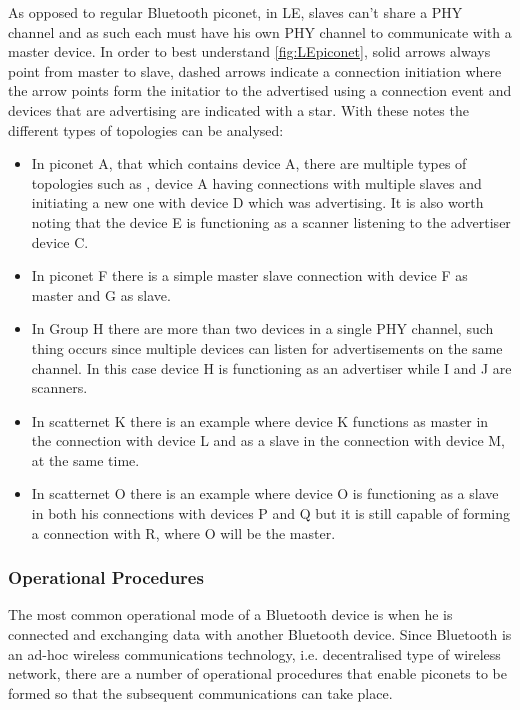 As opposed to regular Bluetooth piconet, in \ac{LE}, slaves can't share a \ac{PHY} channel and as such each must have his own \ac{PHY} channel to communicate with a master device. In order to best understand \ref{fig:LEpiconet}, solid arrows always point from master to slave, dashed arrows indicate a connection initiation where the arrow points form the initatior to the advertised using a connection event and devices that are advertising are indicated with a star. With these notes the different types of topologies can be analysed:

\begin{itemize}
\item In piconet A, that which contains device A, there are multiple types of topologies such as , device A having connections with multiple slaves and initiating a new one with device D which was advertising. It is also worth noting that the device E is functioning as a scanner listening to the advertiser device C.

\item In piconet F there is a simple master slave connection with device F as master and G as slave.

\item In Group H there are more than two devices in a single \ac{PHY} channel, such thing occurs since multiple devices can listen for advertisements on the same channel. In this case device H is functioning as an advertiser while I and J are scanners.

\item In scatternet K there is an example where device K functions as master in the connection with device L and as a slave in the connection with device M, at the same time.

\item In scatternet O there is an example where device O is functioning as a slave in both his connections with devices P and Q but it is still capable of forming a connection with R, where O will be the master.
\end{itemize}

\subsubsection{Operational Procedures}
\label{subsec:Operational}

The most common operational mode of a Bluetooth device is when he is connected and exchanging data with another Bluetooth device. Since Bluetooth is an ad-hoc wireless communications technology, i.e. decentralised type of wireless network, there are a number of operational procedures that enable piconets to be formed so that the subsequent communications can take place.

